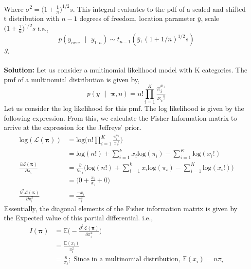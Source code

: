 \documentclass[11pt]{article}
\begin{document}
Where $\sigma^2 = \big(1 + \frac{1}{n}\big)^{1/2}s$. This integral evaluates to the pdf of a scaled and shifted t distribution with $n-1$ degrees of freedom, location parameter $\bar{y}$, scale $\big(1 + \frac{1}{n}\big)^{1/2}s$ i.e.,
\begin{equation}
  \nonumber
  p(y_{new} \text{ }|\text{ } y_{1:n}) \sim t_{n-1}(\bar{y}, (1+1/n)^{1/2}s)
\end{equation}
\emph{3.}\\ \\
\textbf{Solution: }Let us consider a multinomial likelihood model with K categories. The pmf of a multinomial distribution is given by,
\begin{equation}
  \nonumber
  p(y \text{ }|\text{ } \bm{\pi}, n) = n! \prod_{i = 1}^{K} \frac{\pi_{i}^{x_{1}}}{x_{i}!}
\end{equation}
Let us consider the log likelihood for this pmf. The log likelihood is given by the following expression. From this, we calculate the Fisher Information matrix to arrive at the expression for the Jeffreys' prior.
\begin{equation}
  \nonumber
  \begin{aligned}
    \text{log}(\mathcal{L}(\mathbf{\pi})) & = \text{log}\bigg(n! \prod_{i = 1}^{K} \frac{\pi_{i}^{x_{1}}}{x_{i}!}\bigg)\\
    & = \text{log}(n!) + \sum_{i = 1}^{k} x_{i} \text{log}(\pi_{i}) - \sum_{i = 1}^{K}\text{log}(x_{i}!)\\
    \frac{\partial \mathcal{L}(\mathbf{\pi})}{\partial \pi_{i}} & = \frac{\partial }{\partial \pi_{i}}\bigg(\text{log}(n!) + \sum_{i = 1}^{k} x_{i} \text{log}(\pi_{i}) - \sum_{i = 1}^{K}\text{log}(x_{i}!)\bigg)\\
    & = \bigg(0 + \frac{x_{i}}{\pi_{i}} + 0\bigg)\\
    \frac{\partial^{2} \mathcal{L}(\mathbf{\pi})}{\partial \pi_{i}^2} & = \frac{-x_{i}}{\pi_{i}^{2}}
  \end{aligned}
\end{equation}
Essentially, the diagonal elements of the Fisher information matrix is given by the Expected value of this partial differential. i.e.,
\begin{equation}
  \nonumber
  \begin{aligned}
    I(\mathbf{\pi}) & = \mathbb{E}\bigg(-\frac{\partial^{2} \mathcal{L}(\mathbf{\pi})}{\partial \pi_{i}^2}\bigg)\\
    & = \frac{\mathbb{E}(x_{i})}{\pi_{i}^2}\\
    & = \frac{n}{\pi_{i}}; \text{ Since in a multinomial distribution, } \mathbb{E}(x_{i}) = n \pi_{i}
  \end{aligned}
\end{equation}
\end{document}

